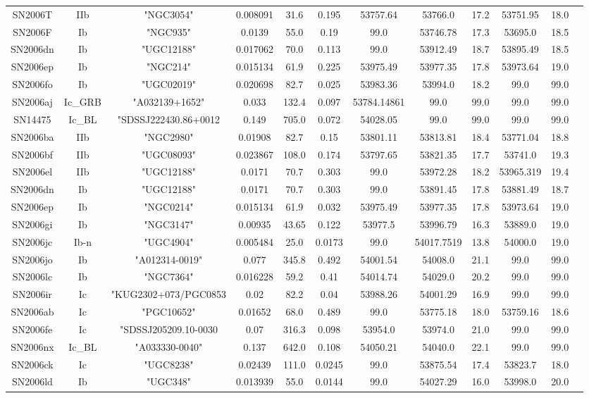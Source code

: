 \begin{table*}
\begin{tabular}{cccccccccccc}
SN2006T&IIb&"NGC3054"&0.008091&31.6&0.195&53757.64&53766.0&17.2&53751.95&18.0\\ 
SN2006F&Ib&"NGC935"&0.0139&55.0&0.19&99.0&53746.78&17.3&53695.0&18.5\\ 
SN2006dn&Ib&"UGC12188"&0.017062&70.0&0.113&99.0&53912.49&18.7&53895.49&18.5\\ 
SN2006ep&Ib&"NGC214"&0.015134&61.9&0.225&53975.49&53977.35&17.8&53973.64&19.0\\ 
SN2006fo&Ib&"UGC02019"&0.020698&82.7&0.025&53983.36&53994.0&18.2&99.0&99.0\\ 
SN2006aj&Ic_GRB&"A032139+1652"&0.033&132.4&0.097&53784.14861&99.0&99.0&99.0&99.0\\ 
SN14475&Ic_BL&"SDSSJ222430.86+0012&0.149&705.0&0.072&54028.05&99.0&99.0&99.0&99.0\\ 
SN2006ba&IIb&"NGC2980"&0.01908&82.7&0.15&53801.11&53813.81&18.4&53771.04&18.8\\ 
SN2006bf&IIb&"UGC08093"&0.023867&108.0&0.174&53797.65&53821.35&17.7&53741.0&19.3\\ 
SN2006el&IIb&"UGC12188"&0.0171&70.7&0.303&99.0&53972.28&18.2&53965.319&19.4\\ 
SN2006dn&Ib&"UGC12188"&0.0171&70.7&0.303&99.0&53891.45&17.8&53881.49&18.7\\ 
SN2006ep&Ib&"NGC0214"&0.015134&61.9&0.032&53975.49&53977.35&17.8&53973.64&19.0\\ 
SN2006gi&Ib&"NGC3147"&0.00935&43.65&0.122&53977.5&53996.79&16.3&53889.0&19.0\\ 
SN2006jc&Ib-n&"UGC4904"&0.005484&25.0&0.0173&99.0&54017.7519&13.8&54000.0&19.0\\ 
SN2006jo&Ib&"A012314-0019"&0.077&345.8&0.492&54001.54&54008.0&21.1&99.0&99.0\\ 
SN2006lc&Ib&"NGC7364"&0.016228&59.2&0.41&54014.74&54029.0&20.2&99.0&99.0\\ 
SN2006ir&Ic&"KUG2302+073/PGC0853&0.02&82.2&0.04&53988.26&54001.29&16.9&99.0&99.0\\ 
SN2006ab&Ic&"PGC10652"&0.01652&68.0&0.489&99.0&53775.18&18.0&53759.16&18.6\\ 
SN2006fe&Ic&"SDSSJ205209.10-0030&0.07&316.3&0.098&53954.0&53974.0&21.0&99.0&99.0\\ 
SN2006nx&Ic_BL&"A033330-0040"&0.137&642.0&0.108&54050.21&54040.0&22.1&99.0&99.0\\ 
SN2006ck&Ic&"UGC8238"&0.02439&111.0&0.0245&99.0&53875.54&17.4&53823.7&18.0\\ 
SN2006ld&Ib&"UGC348"&0.013939&55.0&0.0144&99.0&54027.29&16.0&53998.0&20.0\\ 

\end{tabular}
\end{table*}
